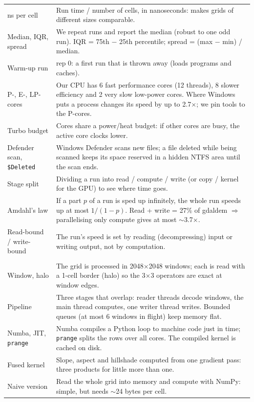 ﻿\documentclass[11pt,a4paper]{article}
\newcommand{\code}[1]{\texttt{#1}}
\begin{document}
\begin{longtable}{>{\raggedright\arraybackslash}p{3.4cm}>{\raggedright\arraybackslash}p{12.0cm}}
ns per cell & Run time / number of cells, in nanoseconds: makes grids of different sizes comparable. \\
Median, IQR, spread & We repeat runs and report the median (robust to one odd run). IQR = 75th $-$ 25th percentile;
spread = (max $-$ min) / median. \\
Warm-up run & rep 0: a first run that is thrown away (loads programs and caches). \\
P-, E-, LP-cores & Our CPU has 6 fast performance cores (12 threads), 8 slower efficiency and 2 very slow low-power cores.
Where Windows puts a process changes its speed by up to 2.7$\times$; we pin tools to the P-cores. \\
Turbo budget & Cores share a power/heat budget: if other cores are busy, the active core clocks lower. \\
Defender scan, \code{\$Deleted} & Windows Defender scans new files; a file deleted while being scanned keeps its space
reserved in a hidden NTFS area until the scan ends. \\
Stage split & Dividing a run into read / compute / write (or copy / kernel for the GPU) to see where time goes. \\
Amdahl's law & If a part $p$ of a run is sped up infinitely, the whole run speeds up at most $1/(1-p)$. Read + write =
27\% of gdaldem $\Rightarrow$ parallelising only compute gives at most $\sim$3.7$\times$. \\
Read-bound / write-bound & The run's speed is set by reading (decompressing) input or writing output, not by
computation. \\
\midrule
\multicolumn{2}{l}{\textit{Our engine (CPU)}} \\
Window, halo & The grid is processed in 2048$\times$2048 windows; each is read with a 1-cell border (halo) so the
3$\times$3 operators are exact at window edges. \\
Pipeline & Three stages that overlap: reader threads decode windows, the main thread computes, one writer thread
writes. Bounded queues (at most 6 windows in flight) keep memory flat. \\
Numba, JIT, \code{prange} & Numba compiles a Python loop to machine code just in time; \code{prange} splits the rows
over all cores. The compiled kernel is cached on disk. \\
Fused kernel & Slope, aspect and hillshade computed from one gradient pass: three products for little more than one. \\
Naive version & Read the whole grid into memory and compute with NumPy: simple, but needs $\sim$24 bytes per cell. \\

\end{longtable}
\end{document}

